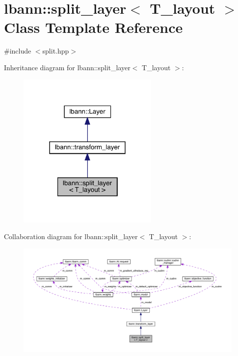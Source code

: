 \hypertarget{classlbann_1_1split__layer}{}\section{lbann\+:\+:split\+\_\+layer$<$ T\+\_\+layout $>$ Class Template Reference}
\label{classlbann_1_1split__layer}


{\ttfamily \#include $<$split.\+hpp$>$}



Inheritance diagram for lbann\+:\+:split\+\_\+layer$<$ T\+\_\+layout $>$\+:\nopagebreak
\begin{figure}[H]
\begin{center}
\leavevmode
\includegraphics[width=195pt]{classlbann_1_1split__layer__inherit__graph}
\end{center}
\end{figure}


Collaboration diagram for lbann\+:\+:split\+\_\+layer$<$ T\+\_\+layout $>$\+:\nopagebreak
\begin{figure}[H]
\begin{center}
\leavevmode
\includegraphics[width=350pt]{classlbann_1_1split__layer__coll__graph}
\end{center}
\end{figure}
